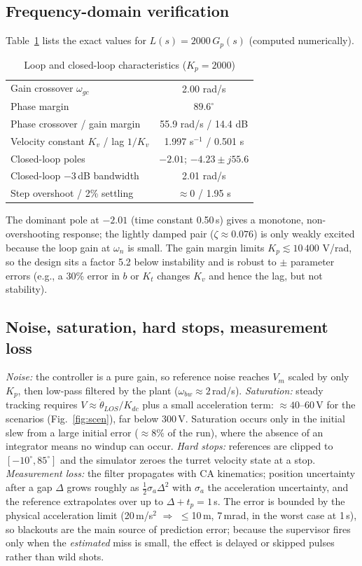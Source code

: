 \documentclass[10pt, conference]{IEEEtran}
\begin{document}
\subsection{Frequency-domain verification}
Table~\ref{tab:margins} lists the exact values for $L(s)=2000\,G_p(s)$ (computed numerically).
\begin{table}[t]
\caption{Loop and closed-loop characteristics ($K_p=2000$)}\label{tab:margins}
\centering\small
\begin{tabular}{lc}
\toprule
Gain crossover $\omega_{gc}$ & 2.00 rad/s\\
Phase margin & $89.6^\circ$\\
Phase crossover / gain margin & 55.9 rad/s / 14.4 dB\\
Velocity constant $K_v$ / lag $1/K_v$ & 1.997 s$^{-1}$ / 0.501 s\\
Closed-loop poles & $-2.01$; $-4.23\pm j55.6$\\
Closed-loop $-3$\,dB bandwidth & 2.01 rad/s\\
Step overshoot / 2\% settling & $\approx0$ / 1.95 s\\
\bottomrule
\end{tabular}
\end{table}
The dominant pole at $-2.01$ (time constant 0.50\,s) gives a monotone, non-overshooting response; the lightly damped pair ($\zeta\approx0.076$) is only weakly excited because the loop gain at $\omega_n$ is small. The gain margin limits $K_p\lesssim10\,400$ V/rad, so the design sits a factor 5.2 below instability and is robust to $\pm$ parameter errors (e.g., a 30\% error in $b$ or $K_t$ changes $K_v$ and hence the lag, but not stability).

\subsection{Noise, saturation, hard stops, measurement loss}
\emph{Noise:} the controller is a pure gain, so reference noise reaches $V_m$ scaled by only $K_p$, then low-pass filtered by the plant ($\omega_{bw}\approx2$\,rad/s). \emph{Saturation:} steady tracking requires $V\approx\dot\theta_{LOS}/K_{dc}$ plus a small acceleration term: $\approx40$--60\,V for the scenarios (Fig.~\ref{fig:scen}), far below 300\,V. Saturation occurs only in the initial slew from a large initial error ($\approx8\%$ of the run), where the absence of an integrator means no windup can occur. \emph{Hard stops:} references are clipped to $[-10^\circ,85^\circ]$ and the simulator zeroes the turret velocity state at a stop. \emph{Measurement loss:} the filter propagates with CA kinematics; position uncertainty after a gap $\Delta$ grows roughly as $\tfrac12\sigma_a\Delta^2$ with $\sigma_a$ the acceleration uncertainty, and the reference extrapolates over up to $\Delta+t_p=1$\,s. The error is bounded by the physical acceleration limit (20\,m/s$^2$ $\Rightarrow$ $\le$10\,m, 7\,mrad, in the worst case at 1\,s), so blackouts are the main source of prediction error; because the supervisor fires only when the \emph{estimated} miss is small, the effect is delayed or skipped pulses rather than wild shots.
\end{document}
